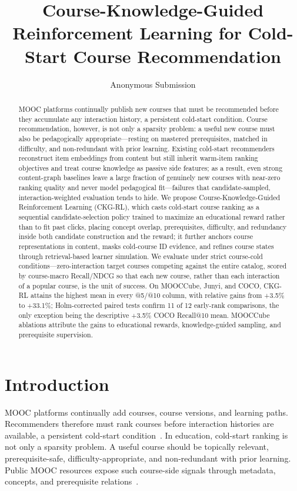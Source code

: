 \documentclass[letterpaper]{article}
\begin{document}
\title{Course-Knowledge-Guided Reinforcement Learning for Cold-Start Course Recommendation}
\author{Anonymous Submission}
\affiliations{}

\maketitle

\begin{abstract}
MOOC platforms continually publish new courses that must be recommended before they accumulate any interaction history, a persistent cold-start condition. Course recommendation, however, is not only a sparsity problem: a useful new course must also be pedagogically appropriate---resting on mastered prerequisites, matched in difficulty, and non-redundant with prior learning. Existing cold-start recommenders reconstruct item embeddings from content but still inherit warm-item ranking objectives and treat course knowledge as passive side features; as a result, even strong content-graph baselines leave a large fraction of genuinely new courses with near-zero ranking quality and never model pedagogical fit---failures that candidate-sampled, interaction-weighted evaluation tends to hide. We propose Course-Knowledge-Guided Reinforcement Learning (CKG-RL), which casts cold-start course ranking as a sequential candidate-selection policy trained to maximize an educational reward rather than to fit past clicks, placing concept overlap, prerequisites, difficulty, and redundancy inside both candidate construction and the reward; it further anchors course representations in content, masks cold-course ID evidence, and refines course states through retrieval-based learner simulation. We evaluate under strict course-cold conditions---zero-interaction target courses competing against the entire catalog, scored by course-macro Recall/NDCG so that each new course, rather than each interaction of a popular course, is the unit of success. On MOOCCube, Junyi, and COCO, CKG-RL attains the highest mean in every @5/@10 column, with relative gains from +3.5\% to +33.1\%; Holm-corrected paired tests confirm 11 of 12 early-rank comparisons, the only exception being the descriptive +3.5\% COCO Recall@10 mean. MOOCCube ablations attribute the gains to educational rewards, knowledge-guided sampling, and prerequisite supervision.
\end{abstract}

\section{Introduction}
MOOC platforms continually add courses, course versions, and learning paths. Recommenders therefore must rank courses before interaction histories are available, a persistent cold-start condition~\cite{schein2002coldstart,gantner2010attribute,lin2024tdro,zhang2025coldstartllm}. In education, cold-start ranking is not only a sparsity problem. A useful course should be topically relevant, prerequisite-safe, difficulty-appropriate, and non-redundant with prior learning. Public MOOC resources expose such course-side signals through metadata, concepts, and prerequisite relations~\cite{yu2020mooccube,wang2021mooccubex}.
\end{document}
